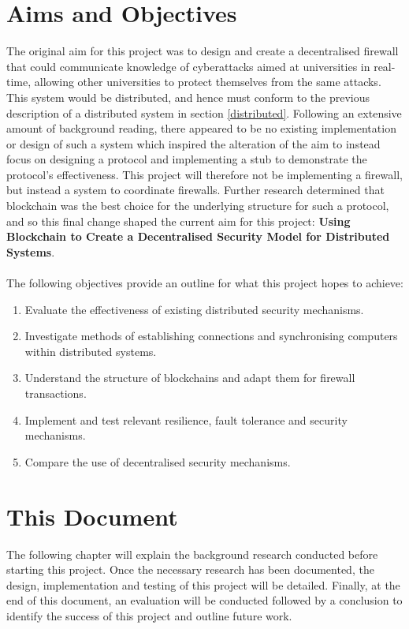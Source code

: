 \documentclass[a4paper, 11pt]{report}
\begin{document}
\section{Aims and Objectives} \label{aim}
The original aim for this project was to design and create a decentralised firewall that could communicate knowledge of cyberattacks aimed at universities in real-time, allowing other universities to protect themselves from the same attacks. This system would be distributed, and hence must conform to the previous description of a distributed system in section \ref{distributed}. Following an extensive amount of background reading, there appeared to be no existing implementation or design of such a system which inspired the alteration of the aim to instead focus on designing a protocol and implementing a \gls{stub} to demonstrate the protocol's effectiveness. This project will therefore not be implementing a firewall, but instead a system to coordinate firewalls. Further research determined that \gls{blockchain} was the best choice for the underlying structure for such a protocol, and so this final change shaped the current aim for this project: \textbf{Using Blockchain to Create a Decentralised Security Model for Distributed Systems}.\\\\

The following objectives provide an outline for what this project hopes to achieve:

\begin{enumerate}
    \item Evaluate the effectiveness of existing distributed security mechanisms.
    \item Investigate methods of establishing connections and synchronising computers within distributed systems.
    \item Understand the structure of \gls{blockchain}s and adapt them for firewall transactions.
    \item Implement and test relevant resilience, fault tolerance and security mechanisms.
    \item Compare the use of decentralised security mechanisms.
\end{enumerate}

\section{This Document}
The following chapter will explain the background research conducted before starting this project. Once the necessary research has been documented, the design, implementation and testing of this project will be detailed. Finally, at the end of this document, an evaluation will be conducted followed by a conclusion to identify the success of this project and outline future work.
\end{document}
